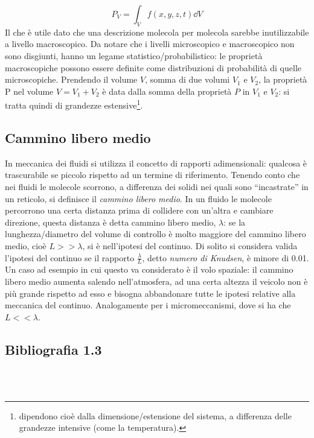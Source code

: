 %
	\begin{equation*}
		P_V = \int_V f(x, y, z, t) \dd{V}
	\end{equation*}
%
Il che è utile dato che una descrizione molecola per molecola sarebbe inutilizzabile a livello macroscopico. Da notare che i livelli microscopico e macroscopico non sono disgiunti, hanno un legame statistico/probabilistico: le proprietà macroscopiche possono essere definite come distribuzioni di probabilità di quelle microscopiche.
%
Prendendo il volume $V$, somma di due volumi $V_1$ e $V_2$, la proprietà P nel volume $V = V_1 + V_2$ è data dalla somma della proprietà $P$ in $V_1$ e $V_2$: si tratta quindi di grandezze estensive\footnote{dipendono cioè dalla dimensione/estensione del sistema, a differenza delle grandezze intensive (come la temperatura).}.
%
\subsection{Cammino libero medio}
In meccanica dei fluidi si utilizza il concetto di rapporti adimensionali: qualcosa è trascurabile se piccolo rispetto ad un termine di riferimento. Tenendo conto che nei fluidi le molecole scorrono, a differenza dei solidi nei quali sono ``incastrate'' in un reticolo, si definisce il \textit{cammino libero medio}.
In un fluido le molecole percorrono una certa distanza prima di collidere con un'altra e cambiare direzione, questa distanza è detta cammino libero medio, $\lambda$: se la lunghezza/diametro del volume di controllo è molto maggiore del cammino libero medio, cioè $L >> \lambda$, si è nell'ipotesi del continuo.
Di solito si considera valida l'ipotesi del continuo se il rapporto $\frac{\lambda}{L}$, detto \textit{numero di Knudsen}, è minore di 0.01.
Un caso ad esempio in cui questo va considerato è il volo spaziale: il cammino libero medio aumenta salendo nell'atmosfera, ad una certa altezza il veicolo non è più grande rispetto ad esso e bisogna abbandonare tutte le ipotesi relative alla meccanica del continuo.
Analogamente per i micromeccanismi, dove si ha che $L << \lambda$.
%
\subsection*{Bibliografia 1.3}
\cite[Cap.\ 2.1, 2.2]{CengelCimbala}\\
\cite[Cap.\ 1.3, pag.\ 8, 9, 15 ]{LuchiniQuadrio}\\
\cite[Cap.\ 1.2, 1.9]{PnueliGutfinger}